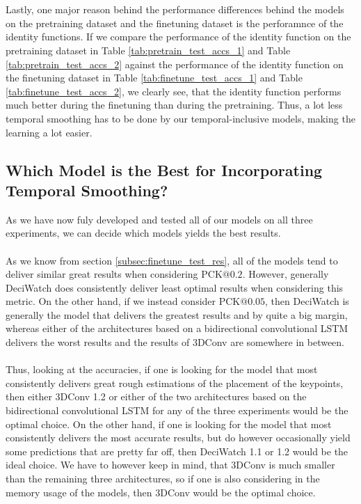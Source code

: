 \documentclass[./main.tex]{subfiles}
\begin{document}
\\
\\
Lastly, one major reason behind the performance differences behind the models on the pretraining dataset and the finetuning dataset is the perforamnce of the identity functions. If we compare the performance of the identity function on the pretraining dataset in Table \ref{tab:pretrain_test_accs_1} and Table \ref{tab:pretrain_test_accs_2} against the performance of the identity function on the finetuning dataset in Table \ref{tab:finetune_test_accs_1} and Table \ref{tab:finetune_test_accs_2}, we clearly see, that the identity function performs much better during the finetuning than during the pretraining. Thus, a lot less temporal smoothing has to be done by our temporal-inclusive models, making the learning a lot easier.

\subsection{Which Model is the Best for Incorporating Temporal Smoothing?}
\label{sec:best_model}
As we have now fuly developed and tested all of our models on all three experiments, we can decide which models yields the best results.
\\
\\
As we know from section \ref{subsec:finetune_test_res}, all of the models tend to deliver similar great results when considering PCK$@0.2$. However, generally DeciWatch does consistently deliver least optimal results when considering this metric. On the other hand, if we instead consider PCK$@0.05$, then DeciWatch is generally the model that delivers the greatest results and by quite a big margin, whereas either of the architectures based on a bidirectional convolutional LSTM delivers the worst results and the results of 3DConv are somewhere in between.
\\
\\
Thus, looking at the accuracies, if one is looking for the model that most consistently delivers great rough estimations of the placement of the keypoints, then either 3DConv 1.2 or either of the two architectures based on the bidirectional convolutional LSTM for any of the three experiments would be the optimal choice. On the other hand, if one is looking for the model that most consistently delivers the most accurate results, but do however occasionally yield some predictions that are pretty far off, then DeciWatch 1.1 or 1.2 would be the ideal choice. We have to however keep in mind, that 3DConv is much smaller than the remaining three architectures, so if one is also considering in the memory usage of the models, then 3DConv would be the optimal choice.
\end{document}
